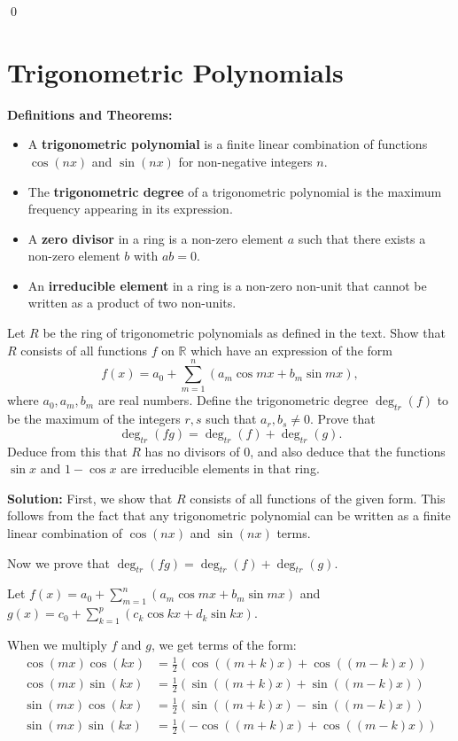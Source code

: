 \qed
\section{Trigonometric Polynomials}

\noindent\textbf{Definitions and Theorems:}
\begin{itemize}
\item A \textbf{trigonometric polynomial} is a finite linear combination of functions $\cos(nx)$ and $\sin(nx)$ for non-negative integers $n$.
\item The \textbf{trigonometric degree} of a trigonometric polynomial is the maximum frequency appearing in its expression.
\item A \textbf{zero divisor} in a ring is a non-zero element $a$ such that there exists a non-zero element $b$ with $ab = 0$.
\item An \textbf{irreducible element} in a ring is a non-zero non-unit that cannot be written as a product of two non-units.
\end{itemize}

\begin{problembox}
Let $R$ be the ring of trigonometric polynomials as defined in the text. Show that $R$ consists of all functions $f$ on $\mathbb{R}$ which have an expression of the form
\[ f(x) = a_0 + \sum_{m=1}^n (a_m \cos mx + b_m \sin mx), \]
where $a_0, a_m, b_m$ are real numbers. Define the trigonometric degree $\deg_{tr}(f)$ to be the maximum of the integers $r, s$ such that $a_r, b_s \neq 0$. Prove that
\[ \deg_{tr}(fg) = \deg_{tr}(f) + \deg_{tr}(g). \]
Deduce from this that $R$ has no divisors of $0$, and also deduce that the functions $\sin x$ and $1 - \cos x$ are irreducible elements in that ring.
\end{problembox}

\noindent\textbf{Solution:}
First, we show that $R$ consists of all functions of the given form. This follows from the fact that any trigonometric polynomial can be written as a finite linear combination of $\cos(nx)$ and $\sin(nx)$ terms.

Now we prove that $\deg_{tr}(fg) = \deg_{tr}(f) + \deg_{tr}(g)$.

Let $f(x) = a_0 + \sum_{m=1}^n (a_m \cos mx + b_m \sin mx)$ and $g(x) = c_0 + \sum_{k=1}^p (c_k \cos kx + d_k \sin kx)$.

When we multiply $f$ and $g$, we get terms of the form:
\begin{align*}
\cos(mx) \cos(kx) &= \frac{1}{2}(\cos((m+k)x) + \cos((m-k)x)) \\
\cos(mx) \sin(kx) &= \frac{1}{2}(\sin((m+k)x) + \sin((m-k)x)) \\
\sin(mx) \cos(kx) &= \frac{1}{2}(\sin((m+k)x) - \sin((m-k)x)) \\
\sin(mx) \sin(kx) &= \frac{1}{2}(-\cos((m+k)x) + \cos((m-k)x))
\end{align*}

